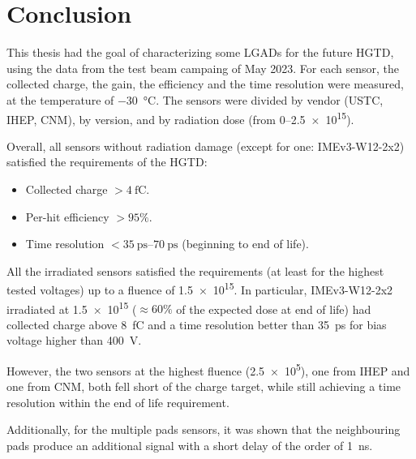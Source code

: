 \chapter*{Conclusion}\label{chap:conclusion}


This thesis had the goal of characterizing some LGADs for the future HGTD, using the data from the test beam campaing of May 2023. For each sensor, the collected charge, the gain, the efficiency and the time resolution were measured, at the temperature of \qty{-30}{\degreeCelsius}. The sensors were divided by vendor (USTC, IHEP, CNM), by version, and by radiation dose (from \qtyrange{0}{2.5e15}{\neutroneq}).

Overall, all sensors without radiation damage (except for one: IMEv3-W12-2x2) satisfied the requirements of the HGTD:
\begin{itemize}
    \item Collected charge \(>\qty{4}{\femto\coulomb}\).
    \item Per-hit efficiency \(>95\%\).
    \item Time resolution \(<\qtyrange{35}{70}{\pico\second}\) (beginning to end of life).
\end{itemize}

All the irradiated sensors satisfied the requirements (at least for the highest tested voltages) up to a fluence of \qty{1.5e15}{\neutroneq}. In particular, IMEv3-W12-2x2 irradiated at \qty{1.5e15}{\neutroneq} (\(\approx60\%\) of the expected dose at end of life) had collected charge above \qty{8}{\femto\coulomb} and a time resolution better than \qty{35}{\pico\second} for bias voltage higher than \qty{400}{\volt}.

However, the two sensors at the highest fluence (\qty{2.5e5}{\neutroneq}), one from IHEP and one from CNM, both fell short of the charge target, while still achieving a time resolution within the end of life requirement.

Additionally, for the multiple pads sensors, it was shown that the neighbouring pads produce an additional signal with a short delay of the order of \qty{1}{\nano\second}.

